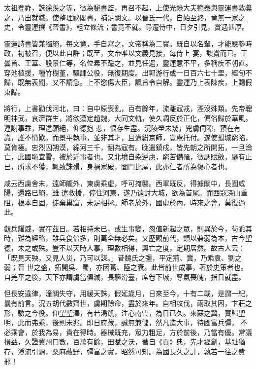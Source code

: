 \begin{pinyinscope}
 太祖登祚，誅徐羨之等，徵為秘書監，再召不起，上使光祿大夫範泰與靈運書敦獎之，乃出就職。使整理祕閣書，補足闕文。以晉氏一代，自始至終，竟無一家之史，令靈運撰《晉書》，粗立條流；書竟不就。尋遷侍中，日夕引見，賞遇甚厚。



 靈運詩書皆兼獨絕，每文竟，手自寫之，文帝稱為二寶。既自以名輩，才能應參時政，初被召，便以此自許；既至，文帝唯以文義見接，每侍上
 宴，談賞而已。王曇首、王華、殷景仁等，名位素不踰之，並見任遇，靈運意不平，多稱疾不朝直。穿池植援，種竹樹堇，驅課公役，無復期度。出郭游行或一日百六七十里，經旬不歸，既無表聞，又不請急。上不慾傷大臣，諷旨令自解。靈運乃上表陳疾，上賜假東歸。



 將行，上書勸伐河北，曰：自中原喪亂，百有餘年，流離寇戎，湮沒殊類。先帝聰明神武，哀濟群生，將欲蕩定趙魏，大同文軌，使久凋反於正化，偏俗歸於華風。運謝事乖，理違願絕，仰德抱
 悲，恨存生盡。況陵塋未幾，兇虜伺隙，預在有識，誰不憤歎。而景平執事，並非其才，且遘紛京師，豈慮托付。遂使孤城窮陷，莫肯極。忠烈囚朔漠，綿河三千，翻為寇有。晚遣鎮戍，皆先朝之所開拓，一旦淪亡，此國恥宜雪，被於近事者也。又北境自染逆虜，窮苦備罹，徵調賦斂，靡有止已，所求不獲，輒致誅殞，身禍家破，闔門比屋，此亦仁者所為傷心者也。



 咸云西虜舍末，遠師隴外，東虜乘虛，呼可掩襲。西軍既反，得據關中，長圍咸陽，還路已絕，雖
 遣救援，停住河東，遂乃遠討大城，欲為首尾。而西寇深山重阻，根本自固，徒棄巢窟，未足相拯。師老於外，國虛於內，時來之會，莫復過此。



 觀兵耀威，實在茲日。若相持未已，或生事變，忽值新起之眾，則異於今，茍乖其時，難為經略，雖兵食倍多，則萬全無必矣。又歷觀前代，類以兼弱為本，古今聖德，未之或殊。豈不以天時人事，理數相得，興亡之度，定期居然。故古人云：「既見天殃，又見人災，乃可以謀。」昔魏氏之彊，平定荊、冀，乃乘袁、劉之弱；晉
 世之盛，拓開吳、蜀，亦因葛、陸之衰。此皆前世成事，著於史策者也。自羌平之後，天下亦謂虜當俱滅，長驅滑臺，席卷下城，奪氣喪魄，指日就盡。



 但長安違律，潼關失守，用緩天誅，假延歲月，日來至今，十有二載，是謂一紀，曩有前言。況五胡代數齊世，虜期餘命，盡於來年。自相攻伐，兩取其困，卞莊之形，驗之今役。仰望聖澤，有若渴飢，注心南雲，為日已久。來蘇之冀，實歸聖明，此而弗乘，後則未兆。即日府藏，誠無兼儲，然凡造大事，待國富兵彊，
 不必乘會，於我為易，貴在得時。器械既充，眾力粗足，方於前後，乃當有優。常議損益，久證冀州口數，百萬有餘，田賦之沃，著自《貢》典，先才經創，基趾猶存，澄流引源，桑麻蔽野，彊富之實，昭然可知。為國長久之計，孰若一往之費邪！




\end{pinyinscope}
